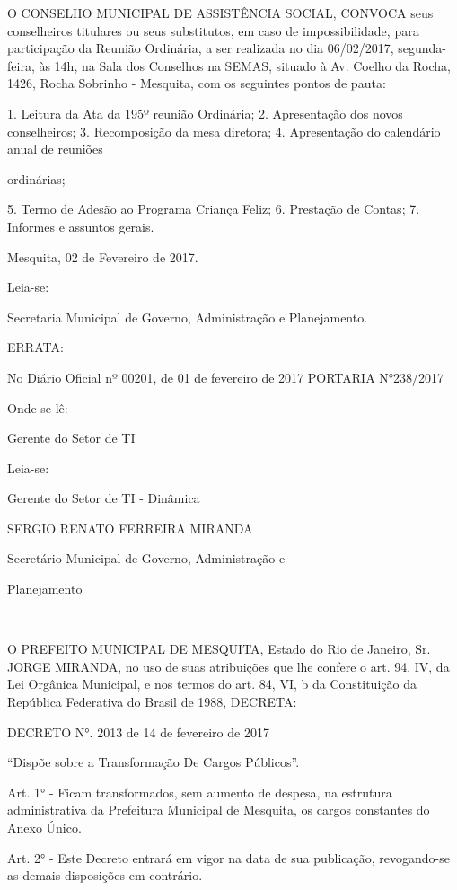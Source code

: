 \documentclass{doliberto}
\begin{document}
O  CONSELHO  MUNICIPAL  DE  ASSISTÊNCIA  SOCIAL, 
CONVOCA  seus  conselheiros  titulares  ou  seus  substitutos, 
em  caso  de  impossibilidade,  para  participação  da  Reunião 
Ordinária,  a  ser  realizada  no  dia  06/02/2017,  segunda-
feira, às 14h, na Sala dos Conselhos na SEMAS, situado à Av. 
Coelho da Rocha, 1426, Rocha Sobrinho - Mesquita, com os 
seguintes pontos de pauta: 

1.  Leitura da Ata da 195º reunião Ordinária; 
2.  Apresentação dos novos conselheiros; 
3.  Recomposição da mesa diretora; 
4.  Apresentação  do  calendário  anual  de  reuniões 

ordinárias; 

5.  Termo de Adesão ao Programa Criança Feliz; 
6.  Prestação de Contas; 
7.  Informes e assuntos gerais. 

Mesquita, 02 de Fevereiro de 2017. 

 
Leia-se: 

Secretaria Municipal de Governo, Administração e 
Planejamento. 

ERRATA: 
 
No Diário Oficial nº 00201, de 01 de fevereiro de 2017 
PORTARIA N°238/2017 
 
Onde se lê: 
 
Gerente do Setor de TI 
 
Leia-se: 
 
Gerente do Setor de TI - Dinâmica 
 
SERGIO RENATO FERREIRA MIRANDA 

Secretário Municipal de Governo, Administração e 

Planejamento 

---

O PREFEITO MUNICIPAL DE MESQUITA, Estado do Rio de 
Janeiro,  Sr.  JORGE  MIRANDA,  no  uso  de  suas  atribuições 
que  lhe  confere  o  art.  94,  IV,  da  Lei  Orgânica  Municipal,  e 
nos  termos  do  art.  84,  VI,  b  da  Constituição  da  República 
Federativa do Brasil de 1988, DECRETA: 

DECRETO N°. 2013 de 14 de fevereiro de 2017 

“Dispõe sobre a Transformação De Cargos Públicos”. 

Art. 1° - Ficam transformados, sem aumento de despesa, na 
estrutura  administrativa  da  Prefeitura  Municipal  de 
Mesquita, os cargos constantes do Anexo Único. 

Art.  2°  -  Este  Decreto  entrará  em  vigor  na  data  de  sua 
publicação,  revogando-se  as  demais  disposições  em 
contrário. 
\end{document}
